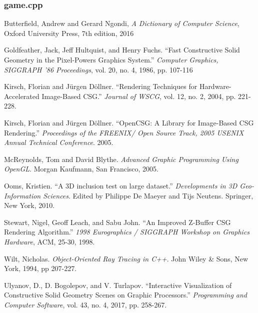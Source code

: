 \documentclass[12pt]{article}
\begin{document}
\begin{onehalfspace}
\subsubsection{game.cpp}


\newpage
\begin{thebibliography}{10}
  Butterfield, Andrew and Gerard Ngondi,
  \textit{A Dictionary of Computer Science},
  Oxford University Press,
  7th edition,
  2016

  Goldfeather, Jack, Jeff Hultquist, and Henry Fuchs. ``Fast Constructive Solid Geometry in the Pixel-Powers Graphics System.'' {\it Computer Graphics, SIGGRAPH '86 Proceedings}, vol. 20, no. 4, 1986,
pp. 107-116
  
  Kirsch, Florian and J\"{u}rgen D\"{o}llner. ``Rendering Techniques for Hardware-Accelerated Image-Based CSG.'' {\it Journal of WSCG}, vol. 12, no. 2, 2004, pp. 221-228.

  Kirsch, Florian and J\"{u}rgen D\"{o}llner. ``OpenCSG: A Library for Image-Based CSG Rendering.'' {\it Proceedings of the FREENIX/ Open Source Track, 2005 USENIX Annual Technical Conference}. 2005.

  McReynolds, Tom and David Blythe. {\it Advanced Graphic Programming Using OpenGL}. Morgan Kaufmann, San Francisco, 2005.

  Ooms, Kristien. ``A 3D inclusion test on large dataset.'' {\it Developments in 3D Geo-Information Sciences}. Edited by Philippe De Maeyer and Tijs Neutens. Springer, New York, 2010.

  Stewart, Nigel, Geoff Leach, and Sabu John. ``An Improved Z-Buffer CSG Rendering Algorithm.'' {\it 1998 Eurographics / SIGGRAPH Workshop on Graphics Hardware}, ACM, 25-30, 1998.

  Wilt, Nicholas. {\it Object-Oriented Ray Tracing in C++}. John Wiley \& Sons, New York, 1994, pp 207-227.

  Ulyanov, D., D. Bogolepov, and V. Turlapov. ``Interactive Visualization of Constructive Solid Geometry Scenes on Graphic Processors.'' {\it Programming and Computer Software}, vol. 43, no. 4, 2017, pp. 258-267.
\end{thebibliography}
\end{onehalfspace}
\end{document}
